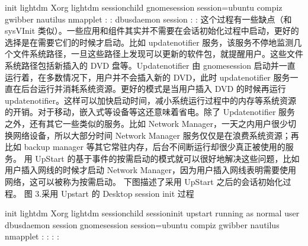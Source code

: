 \documentclass[a4paper,10pt,english]{sphinxmanual}
\begin{document}
\begin{sphinxVerbatim}[commandchars=\\\{\}]
init
 \textbar{}\PYGZhy{} lightdm
 \textbar{}   \textbar{}\PYGZhy{} Xorg
 \textbar{}   \textbar{}\PYGZhy{} lightdm \PYGZhy{}\PYGZhy{}\PYGZhy{}session\PYGZhy{}child
 \textbar{}        \textbar{}\PYGZhy{} gnome\PYGZhy{}session \PYGZhy{}\PYGZhy{}session=ubuntu
 \textbar{}             \textbar{}\PYGZhy{} compiz
 \textbar{}             \textbar{}\PYGZhy{} gwibber
 \textbar{}             \textbar{}\PYGZhy{} nautilus
 \textbar{}             \textbar{}\PYGZhy{} nm\PYGZhy{}applet
 \textbar{}             :
 \textbar{}             :
 \textbar{}
 \textbar{}\PYGZhy{} dbus\PYGZhy{}daemon \PYGZhy{}\PYGZhy{}session
 \textbar{}
 :
 :
这个过程有一些缺点（和 sysVInit 类似）。一些应用和组件其实并不需要在会话初始化过程中启动，更好的选择是在需要它们的时候才启动。比如 update\PYGZhy{}notifier 服务，该服务不停地监测几个文件系统路径，一旦这些路径上发现可以更新的软件包，就提醒用户。这些文件系统路径包括新插入的 DVD 盘等。Update\PYGZhy{}notifier 由 gnome\PYGZhy{}session 启动并一直运行着，在多数情况下，用户并不会插入新的 DVD，此时 update\PYGZhy{}notifier 服务一直在后台运行并消耗系统资源。更好的模式是当用户插入 DVD 的时候再运行 update\PYGZhy{}notifier。这样可以加快启动时间，减小系统运行过程中的内存等系统资源的开销。对于移动，嵌入式等设备等这还意味着省电。除了 Update\PYGZhy{}notifier 服务之外，还有其它一些类似的服务。比如 Network Manager，一天之内用户很少切换网络设备，所以大部分时间 Network Manager 服务仅仅是在浪费系统资源；再比如 backup manager 等其它常驻内存，后台不间断运行却很少真正被使用的服务。
用 UpStart 的基于事件的按需启动的模式就可以很好地解决这些问题，比如用户插入网线的时候才启动 Network Manager，因为用户插入网线表明需要使用网络，这可以被称为按需启动。
下图描述了采用 UpStart 之后的会话初始化过程。
图 3.采用 Upstart 的 Desktop session init 过程

init
 \textbar{}\PYGZhy{} lightdm
 \textbar{}   \textbar{}\PYGZhy{} Xorg
 \textbar{}   \textbar{}\PYGZhy{} lightdm \PYGZhy{}\PYGZhy{}\PYGZhy{}session\PYGZhy{}child
 \textbar{}        \textbar{}\PYGZhy{} session\PYGZhy{}init \PYGZsh{} \PYGZlt{}\PYGZhy{}\PYGZhy{} upstart running as normal user
 \textbar{}             \textbar{}\PYGZhy{} dbus\PYGZhy{}daemon \PYGZhy{}\PYGZhy{}session
 \textbar{}             \textbar{}\PYGZhy{} gnome\PYGZhy{}session \PYGZhy{}\PYGZhy{}session=ubuntu
 \textbar{}             \textbar{}\PYGZhy{} compiz
 \textbar{}             \textbar{}\PYGZhy{} gwibber
 \textbar{}             \textbar{}\PYGZhy{} nautilus
 \textbar{}             \textbar{}\PYGZhy{} nm\PYGZhy{}applet
 \textbar{}             :
 \textbar{}             :
 :
 :
\end{sphinxVerbatim}
\end{document}
